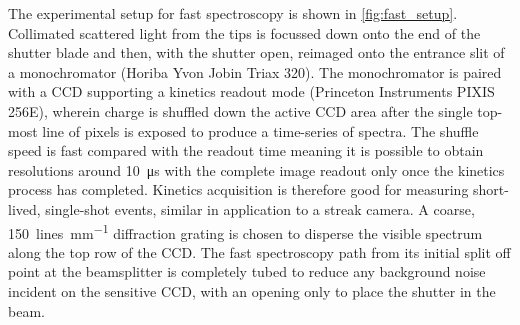 \documentclass[12pt, a4paper, twoside]{book}
\begin{document}
The experimental setup for fast spectroscopy is shown in \autoref{fig:fast_setup}. Collimated scattered light from the tips is focussed down onto the end of the shutter blade and then, with the shutter open, reimaged onto the entrance slit of a monochromator (Horiba Yvon Jobin Triax 320). The monochromator is paired with a CCD supporting a kinetics readout mode (Princeton Instruments PIXIS 256E), wherein charge is shuffled down the active CCD area after the single top-most line of pixels is exposed to produce a time-series of spectra. The shuffle speed is fast compared with the readout time meaning it is possible to obtain resolutions around \SI{10}{\micro\second} with the complete image readout only once the kinetics process has completed. Kinetics acquisition is therefore good for measuring short-lived, single-shot events, similar in application to a streak camera. A coarse, \SI{150}{lines.mm^{-1}} diffraction grating is chosen to disperse the visible spectrum along the top row of the CCD. The fast spectroscopy path from its initial split off point at the beamsplitter is completely tubed to reduce any background noise incident on the sensitive CCD, with an opening only to place the shutter in the beam.
\end{document}
